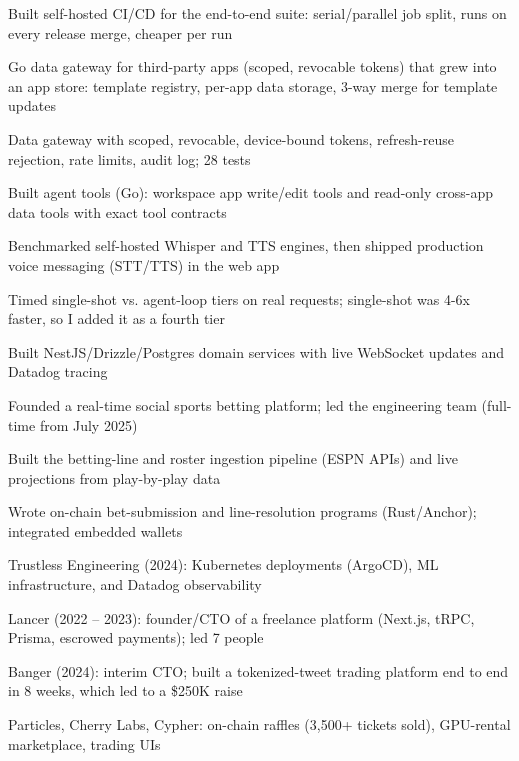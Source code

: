 \documentclass[print]{jack-resume}
\begin{document}
\begin{tightemize}
    \item Built self-hosted CI/CD for the end-to-end suite: serial/parallel job split, runs on every release merge, cheaper per run
    \item Go data gateway for third-party apps (scoped, revocable tokens) that grew into an app store: template registry, per-app data storage, 3-way merge for template updates
    \item Data gateway with scoped, revocable, device-bound tokens, refresh-reuse rejection, rate limits, audit log; 28 tests
    \item Built agent tools (Go): workspace app write/edit tools and read-only cross-app data tools with exact tool contracts
    \item Benchmarked self-hosted Whisper and TTS engines, then shipped production voice messaging (STT/TTS) in the web app
    \item Timed single-shot vs. agent-loop tiers on real requests; single-shot was 4-6x faster, so I added it as a fourth tier
\end{tightemize}
\sectionsep

\begin{tightemize}
    \item Built NestJS/Drizzle/Postgres domain services with live WebSocket updates and Datadog tracing
    \item Founded a real-time social sports betting platform; led the engineering team (full-time from July 2025)
    \item Built the betting-line and roster ingestion pipeline (ESPN APIs) and live projections from play-by-play data
    \item Wrote on-chain bet-submission and line-resolution programs (Rust/Anchor); integrated embedded wallets
\end{tightemize}
\sectionsep

\begin{tightemize}
    \item Trustless Engineering (2024): Kubernetes deployments (ArgoCD), ML infrastructure, and Datadog observability
    \item Lancer (2022 – 2023): founder/CTO of a freelance platform (Next.js, tRPC, Prisma, escrowed payments); led 7 people
    \item Banger (2024): interim CTO; built a tokenized-tweet trading platform end to end in 8 weeks, which led to a \$250K raise
    \item Particles, Cherry Labs, Cypher: on-chain raffles (3,500+ tickets sold), GPU-rental marketplace, trading UIs
\end{tightemize}
\sectionsep
\end{document}

